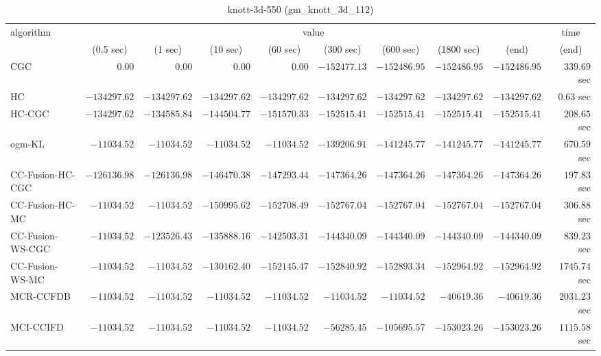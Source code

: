 \begin{table}[H]
\scriptsize
\centering
\caption{knott-3d-550 (gm\_knott\_3d\_112)}
\label{tab:anytimetable-knott-3d-550-gm-knott-3d-112}
\begin{tabular}{lrrrrrrrrr}
\toprule
           algorithm &                                   \multicolumn{8}{c}{value} & \multicolumn{1}{c}{time}   \\  
\cmidrule(lr){2-9}\cmidrule(lr){10-10}   
                     & \multicolumn{1}{c}{(0.5 sec)} & \multicolumn{1}{c}{(1 sec)} & \multicolumn{1}{c}{(10 sec)} & \multicolumn{1}{c}{(60 sec)} & \multicolumn{1}{c}{(300 sec)} & \multicolumn{1}{c}{(600 sec)} & \multicolumn{1}{c}{(1800 sec)} & \multicolumn{1}{c}{(end)} & \multicolumn{1}{c}{(end)}   \\ \midrule 
                 CGC & $         0.00$ & $         0.00$ & $         0.00$ & $         0.00$ & $   -152477.13$ & $   -152486.95$ & $   -152486.95$ & $   -152486.95$ & $       339.69$ sec   \\ 
                  HC & $   -134297.62$ & $   -134297.62$ & $   -134297.62$ & $   -134297.62$ & $   -134297.62$ & $   -134297.62$ & $   -134297.62$ & $   -134297.62$ & $         0.63$ sec   \\ 
              HC-CGC & $   -134297.62$ & $   -134585.84$ & $   -144504.77$ & $   -151570.33$ & $   -152515.41$ & $   -152515.41$ & $   -152515.41$ & $   -152515.41$ & $       208.65$ sec   \\ 
              ogm-KL & $    -11034.52$ & $    -11034.52$ & $    -11034.52$ & $    -11034.52$ & $   -139206.91$ & $   -141245.77$ & $   -141245.77$ & $   -141245.77$ & $       670.59$ sec   \\ 
    CC-Fusion-HC-CGC & $   -126136.98$ & $   -126136.98$ & $   -146470.38$ & $   -147293.44$ & $   -147364.26$ & $   -147364.26$ & $   -147364.26$ & $   -147364.26$ & $       197.83$ sec   \\ 
     CC-Fusion-HC-MC & $    -11034.52$ & $    -11034.52$ & $   -150995.62$ & $   -152708.49$ & $   -152767.04$ & $   -152767.04$ & $   -152767.04$ & $   -152767.04$ & $       306.88$ sec   \\ 
    CC-Fusion-WS-CGC & $    -11034.52$ & $   -123526.43$ & $   -135888.16$ & $   -142503.31$ & $   -144340.09$ & $   -144340.09$ & $   -144340.09$ & $   -144340.09$ & $       839.23$ sec   \\ 
     CC-Fusion-WS-MC & $    -11034.52$ & $    -11034.52$ & $   -130162.40$ & $   -152145.47$ & $   -152840.92$ & $   -152893.34$ & $   -152964.92$ & $   -152964.92$ & $      1745.74$ sec   \\ 
\cmidrule{1-1} 
           MCR-CCFDB & $    -11034.52$ & $    -11034.52$ & $    -11034.52$ & $    -11034.52$ & $    -11034.52$ & $    -11034.52$ & $    -40619.36$ & $    -40619.36$ & $      2031.23$ sec   \\ 
\cmidrule{1-1} 
           MCI-CCIFD & $    -11034.52$ & $    -11034.52$ & $    -11034.52$ & $    -11034.52$ & $    -56285.45$ & $   -105695.57$ & $   -153023.26$ & $   -153023.26$ & $      1115.58$ sec   \\ 
\bottomrule
\end{tabular}
\end{table}

